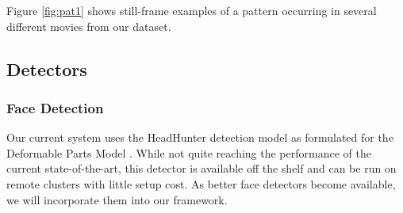 Figure \ref{fig:pat1} shows still-frame examples of a pattern occurring in several different movies from our dataset. 
    

\subsection*{Detectors}
\subsubsection*{Face Detection}
Our current system uses the HeadHunter \cite{mathias_face_2014} detection model as formulated for the Deformable Parts Model \cite{lsvm-pami}. While not quite reaching the performance of the current state-of-the-art, this detector is available off the shelf and can be run on remote clusters with little setup cost. As better face detectors become available, we will incorporate them into our framework.


